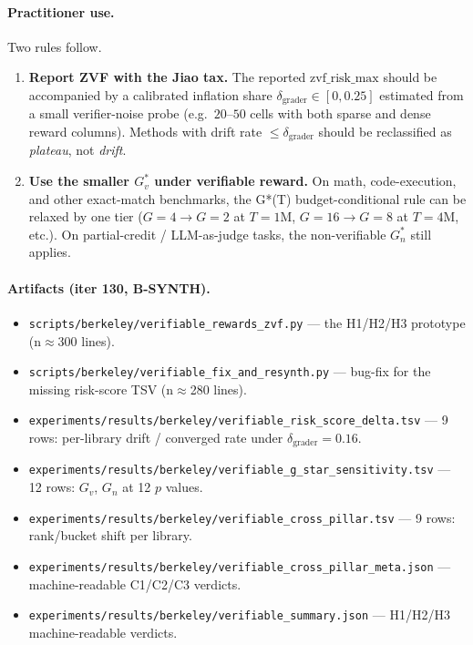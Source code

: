 \paragraph{Practitioner use.} Two rules follow.
\begin{enumerate}
\item \textbf{Report ZVF with the Jiao tax.} The reported
$\mathrm{zvf\_risk\_max}$ should be accompanied by a calibrated
inflation share $\delta_{\mathrm{grader}} \in [0, 0.25]$ estimated
from a small verifier-noise probe (e.g.\ $20$--$50$ cells with
both sparse and dense reward columns). Methods with drift rate
$\le \delta_{\mathrm{grader}}$ should be reclassified as
\emph{plateau}, not \emph{drift}.
\item \textbf{Use the smaller $G_v^*$ under verifiable reward.}
On math, code-execution, and other exact-match benchmarks, the
G*(T) budget-conditional rule can be relaxed by one tier
($G{=}4 \to G{=}2$ at $T{=}1$M, $G{=}16 \to G{=}8$ at $T{=}4$M, etc.).
On partial-credit / LLM-as-judge tasks, the non-verifiable
$G_n^*$ still applies.
\end{enumerate}

\paragraph{Artifacts (iter 130, B-SYNTH).}
\begin{itemize}
\item \texttt{scripts/berkeley/verifiable\_rewards\_zvf.py} ---
the H1/H2/H3 prototype (n$\approx$300 lines).
\item \texttt{scripts/berkeley/verifiable\_fix\_and\_resynth.py} ---
bug-fix for the missing risk-score TSV (n$\approx$280 lines).
\item \texttt{experiments/results/berkeley/verifiable\_risk\_score\_delta.tsv}
--- 9 rows: per-library drift / converged rate under
$\delta_{\mathrm{grader}} = 0.16$.
\item \texttt{experiments/results/berkeley/verifiable\_g\_star\_sensitivity.tsv}
--- 12 rows: $G_v$, $G_n$ at 12 $p$ values.
\item \texttt{experiments/results/berkeley/verifiable\_cross\_pillar.tsv}
--- 9 rows: rank/bucket shift per library.
\item \texttt{experiments/results/berkeley/verifiable\_cross\_pillar\_meta.json}
--- machine-readable C1/C2/C3 verdicts.
\item \texttt{experiments/results/berkeley/verifiable\_summary.json}
--- H1/H2/H3 machine-readable verdicts.
\end{itemize}
